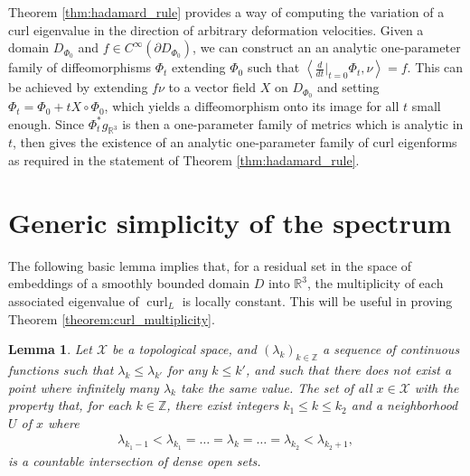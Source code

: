 \documentclass[11pt,reqno]{amsart}
\newtheorem{lemma}{Lemma}[section]
\DeclareMathOperator{\curl}{curl}
\begin{document}
Theorem \ref{thm:hadamard_rule} provides a way of computing the variation of a curl eigenvalue in the direction of arbitrary deformation velocities. Given a domain $D_{\Phi_0}$ and $f \in  C^\infty(\partial D_{\Phi_0})$, we can construct an an analytic one-parameter family of diffeomorphisms $\Phi_t$ extending $\Phi_0$ such that $\left\langle \frac{d}{dt}|_{t=0} \Phi_t, \nu \right\rangle = f$. This can be achieved by extending $f\nu$ to a vector field $X$ on $D_{\Phi_0}$ and setting $\Phi_t = \Phi_0 + t X \circ {\Phi_0}$, which yields a diffeomorphism onto its image for all $t$ small enough. Since $\Phi_t^\ast g_{\mathbb R^3}$ is then a one-parameter family of metrics which is analytic in $t$,  then gives the existence of an analytic one-parameter family of curl eigenforms as required in the statement of Theorem \ref{thm:hadamard_rule}.

\section{Generic simplicity of the spectrum}\label{section: generic simplicity of the spectrum}

The following basic lemma implies that, for a residual set in the space of embeddings of a smoothly bounded domain $D$ into $\mathbb R^3$, the multiplicity of each associated eigenvalue of $\curl_L$ is locally constant. This will be useful in proving Theorem \ref{theorem:curl_multiplicity}.


\begin{lemma}
\label{lemma:abstract_multiplicity}
    Let $\mathcal X$ be a topological space, and $(\lambda_k)_{k\in \mathbb Z}$ a sequence of continuous functions such that $\lambda_k \leq \lambda_{k'}$ for any $k \leq k'$, and such that there does not exist a point where infinitely many $\lambda_k$ take the same value.
    The set of all $x \in \mathcal X$ with the property that, for each $k \in \mathbb Z$, there exist integers $k_1 \leq k \leq k_2$ and a neighborhood $U$ of $x$ where
    \begin{align*}
        \lambda_{k_1-1} < \lambda_{k_1} = \ldots = \lambda_k = \ldots = \lambda_{k_2} < \lambda_{k_2+1},
    \end{align*}
    is a countable intersection of dense open sets.
\end{lemma}
\end{document}
